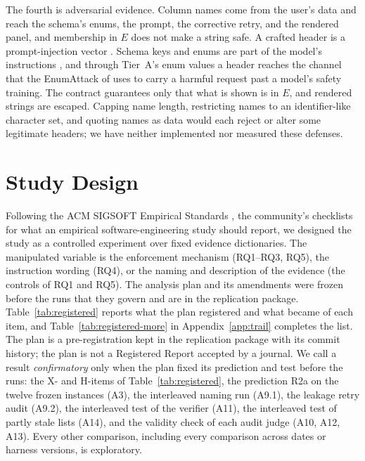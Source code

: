 \documentclass[smallextended,natbib]{svjour3}
\begin{document}
The fourth is adversarial evidence. Column names come from the user's data and
reach the schema's enums, the prompt, the corrective retry, and the rendered
panel, and membership in $E$ does not make a string safe. A crafted header is
a prompt-injection vector \citep{greshake2023injection}. Schema keys and enums
are part of the model's instructions \citep{le2026schemakey}, and through
Tier~A's enum values a header reaches the channel that the EnumAttack of \citet{zhang2025cda} uses to carry a harmful request past a
model's safety training. The contract guarantees only that what is shown is in
$E$, and rendered strings are escaped. Capping name length, restricting names
to an identifier-like character set, and quoting names as data would each
reject or alter some legitimate headers; we have neither implemented nor
measured these defenses.

\section{Study Design}\label{sec:design}

Following the ACM SIGSOFT Empirical Standards \citep{ralph2020standards}, the
community's checklists for what an empirical software-engineering study should
report, we designed the study as a controlled experiment over fixed evidence
dictionaries. The manipulated variable is the enforcement mechanism (RQ1--RQ3,
RQ5), the instruction wording (RQ4), or the naming and description of the
evidence (the controls of RQ1 and RQ5). The analysis plan and its amendments
were frozen before the runs that they govern and are in the replication
package. Table~\ref{tab:registered} reports what the plan registered and what
became of each item, and Table~\ref{tab:registered-more} in
Appendix~\ref{app:trail} completes the list. The plan is a pre-registration kept in the replication
package with its commit history; the plan is not a Registered Report accepted
by a journal. We call a result \emph{confirmatory} only when the plan fixed its
prediction and test before the runs: the X- and H-items of
Table~\ref{tab:registered}, the prediction
R2a on the twelve frozen instances (A3), the interleaved naming run (A9.1), the
leakage retry audit (A9.2), the interleaved test of the verifier (A11), the interleaved
test of partly stale lists (A14), and the validity check of each audit judge
(A10, A12, A13). Every other comparison,
including every comparison across dates or harness versions, is exploratory.
\end{document}
